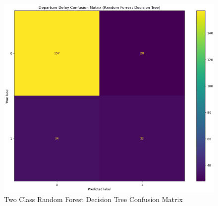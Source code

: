 \documentclass[a4paper,12pt]{article}
\begin{document}
\begin{figure}
    \centering
    \includegraphics*[scale=.50]{../../img/model_rq2_cfmtrx_3.png}
    \caption[]{Two Class Random Forest Decision Tree Confusion Matrix}
    \label{fig:model:rq2:cfmtrx_3}
\end{figure}
\end{document}

